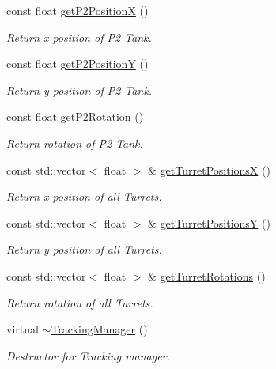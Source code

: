 \begin{DoxyCompactItemize}
const float \hyperlink{classTrackingManager_acb6e621ee44b3d4589fd9e5941eb210f}{get\-P2\-Position\-X} ()
\begin{DoxyCompactList}\small\item\em Return x position of P2 \hyperlink{classTank}{Tank}. \end{DoxyCompactList}\item 
const float \hyperlink{classTrackingManager_af4f90d28fce0d8930ae555a3c1fa4bb8}{get\-P2\-Position\-Y} ()
\begin{DoxyCompactList}\small\item\em Return y position of P2 \hyperlink{classTank}{Tank}. \end{DoxyCompactList}\item 
const float \hyperlink{classTrackingManager_a61bc8a3a82f0cd4064d5e2aa53677ebb}{get\-P2\-Rotation} ()
\begin{DoxyCompactList}\small\item\em Return rotation of P2 \hyperlink{classTank}{Tank}. \end{DoxyCompactList}\item 
const std\-::vector$<$ float $>$ \& \hyperlink{classTrackingManager_ab74d90eb6562d1c25a8a3abefa36d588}{get\-Turret\-Positions\-X} ()
\begin{DoxyCompactList}\small\item\em Return x position of all Turrets. \end{DoxyCompactList}\item 
const std\-::vector$<$ float $>$ \& \hyperlink{classTrackingManager_a82406f448e4cea6dc036e57b467eafaf}{get\-Turret\-Positions\-Y} ()
\begin{DoxyCompactList}\small\item\em Return y position of all Turrets. \end{DoxyCompactList}\item 
const std\-::vector$<$ float $>$ \& \hyperlink{classTrackingManager_ab073910a54a6e8badb90ae3b9e0e3cc7}{get\-Turret\-Rotations} ()
\begin{DoxyCompactList}\small\item\em Return rotation of all Turrets. \end{DoxyCompactList}\item 
virtual \hyperlink{classTrackingManager_aab0fa1e178458935019e6459d11ddea2}{$\sim$\-Tracking\-Manager} ()
\begin{DoxyCompactList}\small\item\em Destructor for Tracking manager. \end{DoxyCompactList}\end{DoxyCompactItemize}
